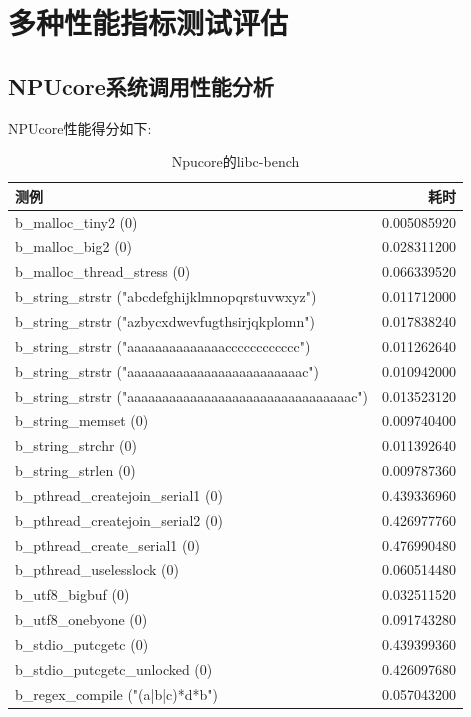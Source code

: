 \section{多种性能指标测试评估}

\subsection{NPUcore系统调用性能分析}

NPUcore性能得分如下:

\begin{table}[H]
    \centering
    \begin{tabular}{|l|r|}
        \hline
        测例 & 耗时 \\
        \hline
        b\_malloc\_tiny2 (0) & 0.005085920 \\
        \hline
        b\_malloc\_big2 (0) & 0.028311200 \\
        \hline
        b\_malloc\_thread\_stress (0) & 0.066339520 \\
        \hline
        b\_string\_strstr ("abcdefghijklmnopqrstuvwxyz") & 0.011712000 \\
        \hline
        b\_string\_strstr ("azbycxdwevfugthsirjqkplomn") & 0.017838240 \\
        \hline
        b\_string\_strstr ("aaaaaaaaaaaaaacccccccccccc") & 0.011262640 \\
        \hline
        b\_string\_strstr ("aaaaaaaaaaaaaaaaaaaaaaaaac") & 0.010942000 \\
        \hline
        b\_string\_strstr ("aaaaaaaaaaaaaaaaaaaaaaaaaaaaaaaac") & 0.013523120 \\
        \hline
        b\_string\_memset (0) & 0.009740400 \\
        \hline
        b\_string\_strchr (0) & 0.011392640 \\
        \hline
        b\_string\_strlen (0) & 0.009787360 \\
        \hline
        b\_pthread\_createjoin\_serial1 (0) & 0.439336960 \\
        \hline
        b\_pthread\_createjoin\_serial2 (0) & 0.426977760 \\
        \hline
        b\_pthread\_create\_serial1 (0) & 0.476990480 \\
        \hline
        b\_pthread\_uselesslock (0) & 0.060514480 \\
        \hline
        b\_utf8\_bigbuf (0) & 0.032511520 \\
        \hline
        b\_utf8\_onebyone (0) & 0.091743280 \\
        \hline
        b\_stdio\_putcgetc (0) & 0.439399360 \\
        \hline
        b\_stdio\_putcgetc\_unlocked (0) & 0.426097680 \\
        \hline
        b\_regex\_compile ("(a|b|c)*d*b") & 0.057043200 \\
        \hline
    \end{tabular}
    \caption{Npucore的libc-bench}
\end{table}

